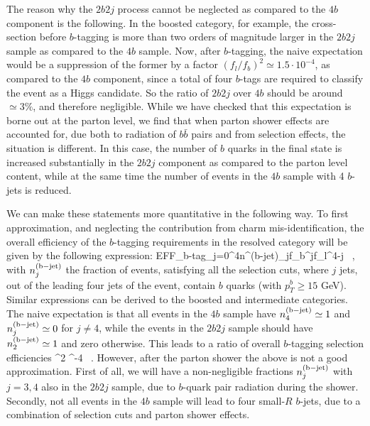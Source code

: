 The reason why the  $2b2j$ process
cannot be neglected as compared to the $4b$ component
is the following.
%
In the boosted category, for example,
the cross-section  before
$b$-tagging is more than two orders
of magnitude larger in the $2b2j$
sample as compared to the $4b$ sample.
%
Now, after $b$-tagging, the naive expectation would
be a suppression of the former by a factor $(f_l/f_b)^2 \simeq
1.5\cdot 10^{-4}$, as compared to the $4b$ component,
since a total of four $b$-tags are required to classify the
event as a Higgs candidate.
%
So the ratio of $2b2j$ over $4b$ should be
around $\simeq 3\%$, and therefore negligible.
While  we have checked that this expectation is borne
out at the parton level,
we find that  when parton shower effects
are accounted for, due both to radiation of $b\bar{b}$ pairs
and from selection effects, the situation is different.
%
In this case,
the
number of  $b$ quarks in the  final state is
increased substantially in the $2b2j$ component as compared
to the parton level content, while at the same
time the number of events in the $4b$ sample
with 4 $b$-jets is reduced.


We can make these statements more quantitative in the following way.
%
To first approximation, and neglecting the contribution from
charm mis-identification,
the
overall efficiency of the $b$-tagging requirements in the resolved category will be
given by the following expression:
\be
\label{btaggingeff}
{\rm EFF}_{\rm b-tag}\simeq \sum_{j=0}^{4}n^{\rm (b-jet)}_j\cdot f_b^{j}\cdot f_l^{4-j} \, ,
\ee
with $n^{\rm (b-jet)}_j$ the fraction of events, satisfying all the selection cuts,
where $j$ jets, out of the leading four jets of the event,
contain $b$ quarks (with $p_T^b\ge 15$
GeV).
%
Similar expressions can be derived to the boosted and intermediate categories.
%
The naive expectation is that all events in the $4b$ sample have $n^{\rm (b-jet)}_4\simeq 1$
and $n^{\rm (b-jet)}_j\simeq 0$ for $j\ne 4$, while the events in the $2b2j$ sample
should have $n^{\rm (b-jet)}_2\simeq 1$ and zero otherwise.
%
This leads to a ratio of overall $b$-tagging selection efficiencies
\be
\label{eq:naive}
  \simeq
 \lp {}\rp^2 ^{-4} \, .
\ee
However, after the parton shower the above is not a good approximation.
%
First of all, we will have a non-negligible fractions $n^{\rm (b-jet)}_j$
with $j=3,4$ also in the $2b2j$ sample, due to $b$-quark pair radiation
during the shower.
%
Secondly, not all events in the $4b$ sample will lead to four small-$R$ $b$-jets,
due to a combination of selection cuts and
parton shower effects.
%

